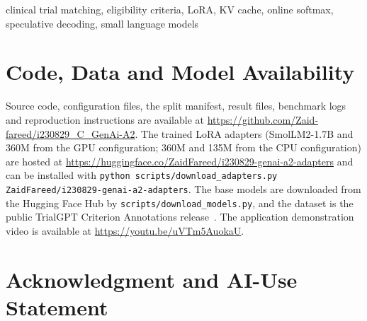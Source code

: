 \documentclass[conference]{IEEEtran}
\begin{document}
\begin{IEEEkeywords}
clinical trial matching, eligibility criteria, LoRA, KV cache, online softmax, speculative decoding, small language models
\end{IEEEkeywords}








\section*{Code, Data and Model Availability}
Source code, configuration files, the split manifest, result files, benchmark logs and reproduction instructions are available at \url{https://github.com/Zaid-fareed/i230829_C_GenAi-A2}. The trained LoRA adapters (SmolLM2-1.7B and 360M from the GPU configuration; 360M and 135M from the CPU configuration) are hosted at \url{https://huggingface.co/ZaidFareed/i230829-genai-a2-adapters} and can be installed with \texttt{python scripts/download\_adapters.py ZaidFareed/i230829-genai-a2-adapters}. The base models are downloaded from the Hugging Face Hub by \texttt{scripts/download\_models.py}, and the dataset is the public TrialGPT Criterion Annotations release~\cite{ncbi2024dataset}. The application demonstration video is available at \url{https://youtu.be/uVTm5AuokaU}.

\section*{Acknowledgment and AI-Use Statement}




\end{document}
